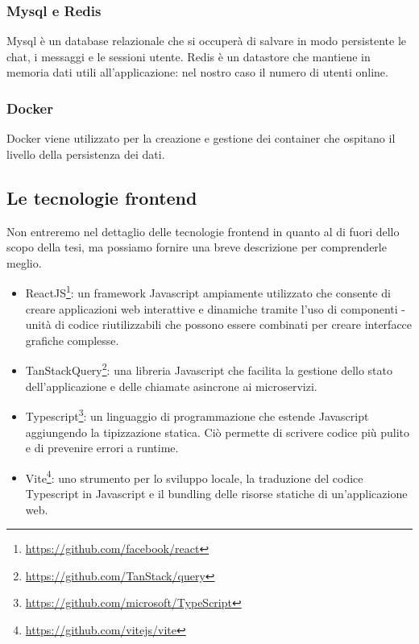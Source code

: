 \subsubsection{Mysql e Redis}
Mysql è un database relazionale che si occuperà di salvare in modo persistente le chat, i messaggi e le sessioni utente.
Redis è un datastore che mantiene in memoria dati utili all'applicazione: nel nostro caso il numero di utenti online.

\subsubsection{Docker}
Docker viene utilizzato per la creazione e gestione dei container che ospitano il livello della persistenza dei dati.

\subsection{Le tecnologie frontend}
Non entreremo nel dettaglio delle tecnologie frontend in quanto al di fuori dello scopo della tesi, ma possiamo fornire
una breve descrizione per comprenderle meglio.

\begin{itemize}
    \item ReactJS\footnote{\url{https://github.com/facebook/react}}: un framework Javascript ampiamente utilizzato che
    consente di creare applicazioni web interattive e dinamiche tramite l'uso di componenti - unità di codice
    riutilizzabili che possono essere combinati per creare interfacce grafiche complesse.
    \item TanStackQuery\footnote{\url{https://github.com/TanStack/query}}: una libreria Javascript che facilita la
    gestione dello stato dell'applicazione e delle chiamate asincrone ai microservizi.
    \item Typescript\footnote{\url{https://github.com/microsoft/TypeScript}}: un linguaggio di programmazione che
    estende Javascript aggiungendo la tipizzazione statica. Ciò permette di scrivere codice più pulito e di prevenire
    errori a runtime.
    \item Vite\footnote{\url{https://github.com/vitejs/vite}}: uno strumento per lo sviluppo locale, la traduzione del
    codice Typescript in Javascript e il bundling delle risorse statiche di un'applicazione web.
\end{itemize}

